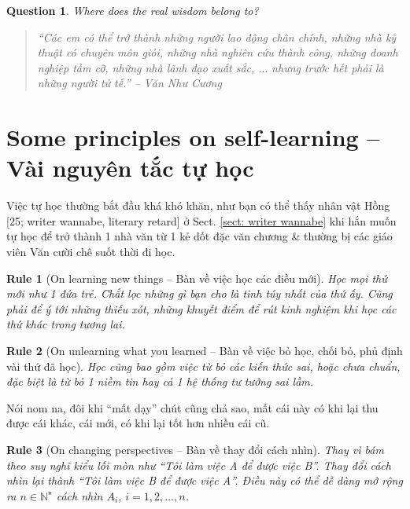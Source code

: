 \documentclass[12pt,twoside]{book}
\newtheorem{question}{Question}
\newtheorem{Rule}{Rule}
\begin{document}
\begin{question}
	Where does the real wisdom belong to?
\end{question}

\begin{quotation}\it
	``Các em có thể trở thành những người lao động chân chính, những nhà kỹ thuật có chuyên môn giỏi, những nhà nghiên cứu thành công, những doanh nghiệp tầm cỡ, những nhà lãnh đạo xuất sắc, $\ldots$ nhưng trước hết phải là những người tử tế.'' -- {\sc Văn Như Cương}
\end{quotation}

\section{Some principles on self-learning -- Vài nguyên tắc tự học}
Việc tự học thường bắt đầu khá khó khăn, như bạn có thể thấy nhân vật {\sf Hồng [25; writer wannabe, literary retard]} ở Sect. \ref{sect: writer wannabe} khi hắn muốn tự học để trở thành 1 nhà văn từ 1 kẻ dốt đặc văn chương \& thường bị các giáo viên Văn cười chê suốt thời đi học.

\begin{Rule}[On learning new things -- Bàn về việc học các điều mới]
	Học mọi thứ mới như 1 đứa trẻ. Chắt lọc những gì bạn cho là tinh túy nhất của thứ ấy. Cũng phải để ý tới những thiếu xót, những khuyết điểm để rút kinh nghiệm khi học các thứ khác trong tương lai.
\end{Rule}

\begin{Rule}[On unlearning what you learned -- Bàn về việc bỏ học, chối bỏ, phủ định vài thứ đã học]
	Học cũng bao gồm việc từ bỏ các kiến thức sai, hoặc chưa chuẩn, đặc biệt là từ bỏ 1 niềm tin hay cả 1 hệ thống tư tưởng sai lầm.
\end{Rule}
Nói nom na, đôi khi ``mất dạy'' chút cũng chả sao, mất cái này có khi lại thu được cái khác, cái mới, có khi lại tốt hơn nhiều cái cũ.

\begin{Rule}[On changing perspectives -- Bàn về thay đổi cách nhìn]
	Thay vì bám theo suy nghĩ kiểu lối mòn như ``Tôi làm việc A để được việc B''. Thay đổi cách nhìn lại thành ``Tôi làm việc B để được việc A''. Điều này có thể dễ dàng mở rộng ra $n\in\mathbb{N}^\star$ cách nhìn $A_i$, $i = 1,2,\ldots,n$.
\end{Rule}
\end{document}
